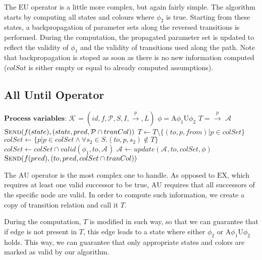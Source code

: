 \documentclass[12pt,oneside,draft]{fithesis2}
\newcommand{\as}[1][]{\ensuremath{\mathcal{A}_{#1}}}
\newcommand{\ks}[1][]{\ensuremath{\mathcal{K}_{#1}}}
\newcommand{\trans}[1]{\stackrel{#1}{\rightarrow}}
\newcommand{\eu}[2]{\ensuremath{\mbox{E} #1 \mbox{U} #2 }}
\newcommand{\au}[2]{\ensuremath{\mbox{A} #1 \mbox{U} #2 }}
\newcommand{\ex}[1]{\ensuremath{\mbox{EX} #1}}
\begin{document}
				The \eu{}{} operator is a little more complex, but again fairly simple. The algorithm starts by computing all states and colours where $\phi_2$ is true. Starting from these states, a backpropagation of parameter sets along the reversed transitions is performed. During the computation, the propagated parameter set is updated to reflect the validity of $\phi_1$ and the validity of transitions used along the path. Note that backpropagation is stoped as soon as there is no new information computed ($colSat$ is either empty or equal to already computed assumptions).
			
		    \subsection{All Until Operator}
				\begin{algorithmic}[1]
				\State $ \textbf{Process variables:} $
				\State $ \ks = (id, f, \mathcal{P}, S, I, \trans{p}, L) $ 
				\State $ \phi = \au{\phi_1}{\phi_2}  $ 
				\State $ T = \trans{p} $ 
				\State $ \as $ 
							\State $ \Call{Send}{f(state), (state, pred, \mathcal{P} \cap tranCol)} $
						\EndFor
					\EndFor
				\EndProcedure
					\State $ T \gets T \setminus \{ (to, p, from) | p \in colSet \} $
					\State $ colSet \gets \{ p | p \in colSet \wedge \forall s_2 \in S. (to, p, s_2) \notin T \} $
					\State $ colSet \gets colSet \cap valid(\phi_1, to, \as)$
					\If{$ colSet \neq \emptyset $ \textbf{and} $ colSet \setminus valid(\phi, to, \as) \neq \emptyset $}
						\State $ \as \gets update(\as, to, colSet, \phi) $
							\State $ \Call{Send}{f(pred), (to, pred, colSet \cap tranCol)} $
						\EndFor
					\EndIf
				\EndProcedure
				\end{algorithmic}	
				
				The \au{}{} operator is the most complex one to handle. As opposed to \ex{}{}, which requires at least one valid successor to be true, \au{}{} requires that all successors of the specific node are valid. In order to compute such information, we create a copy of transition relation and call it $T$. 
				
				During the computation, $T$ is modified in such way, so that we can guarantee that if edge is not present in $T$, this edge leads to a state where either $\phi_2$ or \au{\phi_1}{\phi_2} holds. This way, we can guarantee that only appropriate states and colors are marked as valid by our algorithm.				
	
\end{document}
